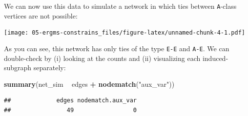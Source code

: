 \documentclass[]{book}
\newenvironment{Shaded}{\begin{snugshade}}{\end{snugshade}}
\newcommand{\CommentTok}[1]{\textcolor[rgb]{0.56,0.35,0.01}{\textit{#1}}}
\newcommand{\DataTypeTok}[1]{\textcolor[rgb]{0.13,0.29,0.53}{#1}}
\newcommand{\DecValTok}[1]{\textcolor[rgb]{0.00,0.00,0.81}{#1}}
\newcommand{\FloatTok}[1]{\textcolor[rgb]{0.00,0.00,0.81}{#1}}
\newcommand{\KeywordTok}[1]{\textcolor[rgb]{0.13,0.29,0.53}{\textbf{#1}}}
\newcommand{\NormalTok}[1]{#1}
\newcommand{\OperatorTok}[1]{\textcolor[rgb]{0.81,0.36,0.00}{\textbf{#1}}}
\newcommand{\OtherTok}[1]{\textcolor[rgb]{0.56,0.35,0.01}{#1}}
\newcommand{\StringTok}[1]{\textcolor[rgb]{0.31,0.60,0.02}{#1}}
\begin{document}
We can now use this data to simulate a network in which ties between
\texttt{A}-class vertices are not possible:

\begin{Shaded}
\end{Shaded}

\texttt{[image: 05-ergms-constrains\_files/figure-latex/unnamed-chunk-4-1.pdf]}

As you can see, this network has only ties of the type \texttt{E-E} and \texttt{A-E}. We can
double-check by (i) looking at the counts and (ii) visualizing each induced-subgraph
separately:

\begin{Shaded}
\begin{Highlighting}[]
\KeywordTok{summary}\NormalTok{(net_sim }\OperatorTok{~}\StringTok{ }\NormalTok{edges }\OperatorTok{+}\StringTok{ }\KeywordTok{nodematch}\NormalTok{(}\StringTok{"aux_var"}\NormalTok{))}
\end{Highlighting}
\end{Shaded}

\begin{verbatim}
##             edges nodematch.aux_var 
##                49                 0
\end{verbatim}

\begin{Shaded}
\end{Shaded}
\end{document}
